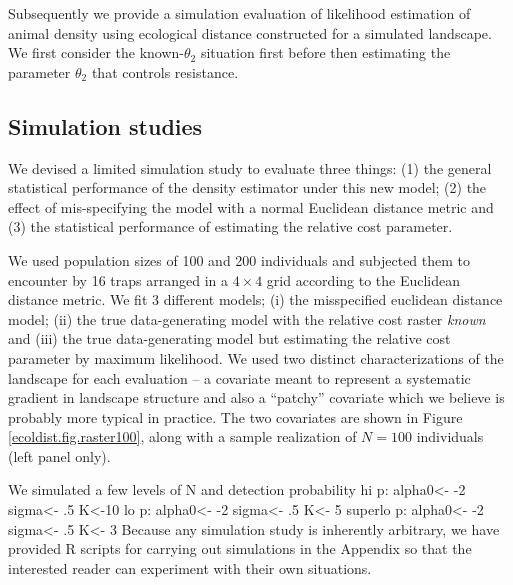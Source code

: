\documentclass[12pt]{article}
\begin{document}
Subsequently we provide a simulation evaluation of likelihood estimation of animal density using ecological
distance constructed for a simulated landscape. We first consider the known-$\theta_{2}$ situation first
before then estimating the parameter $\theta_{2}$ that controls resistance.


\subsection{Simulation studies}

We devised a limited simulation study to evaluate three things: (1)
the general statistical performance of the density estimator under
this new model; (2) the effect of mis-specifying the model with a
normal Euclidean distance metric and (3) the statistical performance
of estimating the relative cost parameter.

We used population sizes of 100 and 200 individuals and subjected them
to encounter by 16 traps arranged in a $4\times 4$ grid according to
the Euclidean distance metric. We fit 3 different models; (i) the
misspecified euclidean distance model; (ii) the true data-generating
model with the relative cost raster {\it known} and (iii) the true
data-generating model but estimating the relative cost parameter by
maximum likelihood.  We used two distinct characterizations of the
landscape for each evaluation -- a covariate meant to represent a
systematic gradient in landscape structure and also a ``patchy''
covariate which we believe is probably more typical in practice. The
two covariates are shown in Figure \ref{ecoldist.fig.raster100}, along
with a sample realization of $N=100$ individuals (left panel only).


We simulated a few levels of N and detection probability
hi p: alpha0<- -2     sigma<- .5    K<-10
lo p: alpha0<- -2     sigma<- .5    K<- 5
superlo p: alpha0<- -2     sigma<- .5    K<- 3
Because any simulation study is inherently arbitrary, we have provided R scripts
for carrying out simulations in the Appendix so that the interested reader can experiment with
their own situations.
\end{document}
